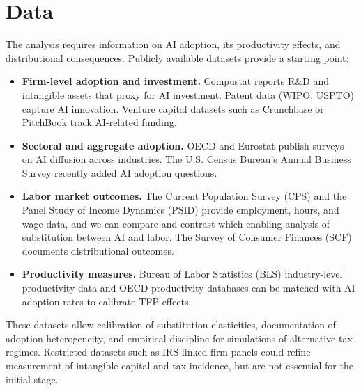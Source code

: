 \section*{Data}

The analysis requires information on AI adoption, its productivity effects, and distributional consequences. Publicly available datasets provide a starting point:  

\begin{itemize}
    \item \textbf{Firm-level adoption and investment.} Compustat reports R\&D and intangible assets that proxy for AI investment. Patent data (WIPO, USPTO) capture AI innovation. Venture capital datasets such as Crunchbase or PitchBook track AI-related funding.  
    \item \textbf{Sectoral and aggregate adoption.} OECD and Eurostat publish surveys on AI diffusion across industries. The U.S. Census Bureau’s Annual Business Survey recently added AI adoption questions.  
    \item \textbf{Labor market outcomes.} The Current Population Survey (CPS) and the Panel Study of Income Dynamics (PSID) provide employment, hours, and wage data, and we can compare and contrast which enabling analysis of substitution between AI and labor. The Survey of Consumer Finances (SCF) documents distributional outcomes.  
    \item \textbf{Productivity measures.} Bureau of Labor Statistics (BLS) industry-level productivity data and OECD productivity databases can be matched with AI adoption rates to calibrate TFP effects.  
\end{itemize}

These datasets allow calibration of substitution elasticities, documentation of adoption heterogeneity, and empirical discipline for simulations of alternative tax regimes. Restricted datasets such as IRS-linked firm panels could refine measurement of intangible capital and tax incidence, but are not essential for the initial stage.
\newpage






